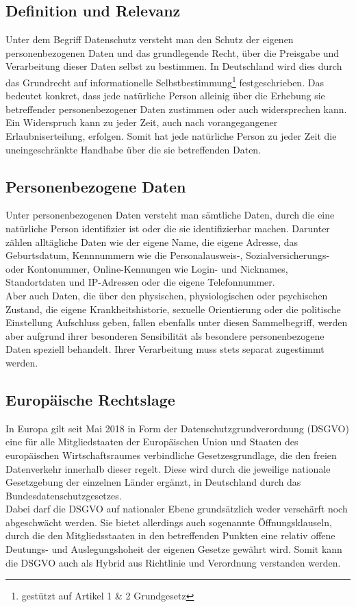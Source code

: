 \subsection{Definition und Relevanz}
    Unter dem Begriff Datenschutz versteht man den Schutz der eigenen personenbezogenen Daten und das grundlegende Recht, über die Preisgabe und Verarbeitung dieser Daten selbst zu bestimmen. In Deutschland wird dies durch das Grundrecht auf informationelle Selbstbestimmung\footnote{gestützt auf Artikel 1 \& 2 Grundgesetz} festgeschrieben. Das bedeutet konkret, dass jede natürliche Person alleinig über die Erhebung sie betreffender personenbezogener Daten zustimmen oder auch widersprechen kann. Ein Widerspruch kann zu jeder Zeit, auch nach vorangegangener Erlaubniserteilung, erfolgen. Somit hat jede natürliche Person zu jeder Zeit die uneingeschränkte Handhabe über die sie betreffenden Daten.

\subsection{Personenbezogene Daten}
    Unter personenbezogenen Daten versteht man sämtliche Daten, durch die eine natürliche Person identifizier ist oder die sie identifizierbar machen. Darunter zählen alltägliche Daten wie der eigene Name, die eigene Adresse, das Geburtsdatum, Kennnummern wie die Personalausweis-, Sozialversicherungs- oder Kontonummer, Online-Kennungen wie Login- und Nicknames, Standortdaten und IP-Adressen oder die eigene Telefonnummer.\\
    Aber auch Daten, die über den physischen, physiologischen oder psychischen Zustand, die eigene Krankheitshistorie, sexuelle Orientierung oder die politische Einstellung Aufschluss geben, fallen ebenfalls unter diesen Sammelbegriff, werden aber aufgrund ihrer besonderen Sensibilität als \glqq besondere personenbezogene Daten\grqq{} speziell behandelt. Ihrer Verarbeitung muss stets separat zugestimmt werden.

\subsection{Europäische Rechtslage}
    In Europa gilt seit Mai 2018 in Form der \glqq Datenschutzgrundverordnung\grqq{} (DSGVO) eine für alle Mitgliedstaaten der Europäischen Union und Staaten des europäischen Wirtschaftsraumes verbindliche Gesetzesgrundlage, die den freien Datenverkehr innerhalb dieser regelt. Diese wird durch die jeweilige nationale Gesetzgebung der einzelnen Länder ergänzt, in Deutschland durch das Bundesdatenschutzgesetzes.\\
    Dabei darf die DSGVO auf nationaler Ebene grundsätzlich weder verschärft noch abgeschwächt werden. Sie bietet allerdings auch sogenannte Öffnungsklauseln, durch die den Mitgliedsstaaten in den betreffenden Punkten eine relativ offene Deutungs- und Auslegungshoheit der eigenen Gesetze gewährt wird. Somit kann die DSGVO auch als Hybrid aus Richtlinie und Verordnung verstanden werden.\\

